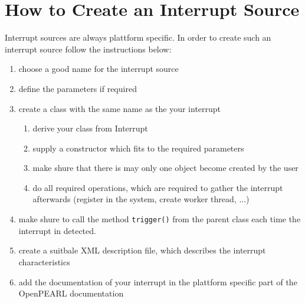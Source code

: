 \section{How to Create an Interrupt Source}
Interrupt sources are always plattform specific.
In order to create such an interrupt source follow the instructions below:
\begin{enumerate}
\item choose a good name for the interrupt source
\item define the parameters if required
\item create a class with the same name as the your interrupt 
  \begin{enumerate}
  \item  derive your class from Interrupt  
  \item supply a constructor which fits to the required parameters
  \item make shure that there is may only one object become created
        by the user
  \item do all required operations, which are required to gather 
        the interrupt afterwards (register in the system, create 
        worker thread, ...)
  \end{enumerate}
\item make shure to call the method \verb|trigger()| from the parent
      class each time the interrupt in detected.
\item create a suitbale XML description file, which describes the interrupt
      characteristics
\item add the documentation of your interrupt in the plattform specific part
      of the OpenPEARL documentation
\end{enumerate}

